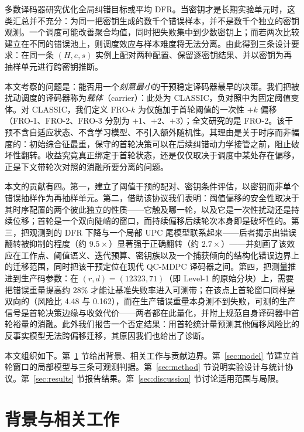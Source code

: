 \documentclass[UTF8,a4paper,10pt,twocolumn]{ctexart}
\begin{document}
多数译码器研究优化全局纠错目标或平均 DFR。当密钥才是长期实验单元时，这类汇总并不充分：为同一把密钥生成的数千个错误样本，并不是数千个独立的密钥观测。一个调度可能改善聚合均值，同时把失败集中到少数密钥上；而若两次比较建立在不同的错误池上，则调度效应与样本难度将无法分离。由此得到三条设计要求：在同一条 $(H,e,s)$ 实例上配对两种配置、保留逐密钥结果、并以密钥为再抽样单元进行跨密钥推断。

本文考察的问题是：能否用一个\emph{刻意最小}的干预稳定译码器最早的决策。我们把被扰动调度的译码器称为\emph{载体}（carrier）：此处为 CLASSIC，负对照中为固定阈值变体。对 CLASSIC，我们定义 FRO-$k$ 为仅施加于首轮阈值的一次性 $+k$ 偏移（FRO-1、FRO-2、FRO-3 分别为 $+1$、$+2$、$+3$）；全文研究的是 FRO-2。该干预不含自适应状态、不含学习模型、不引入额外随机性。其理由是关于时序而非幅度的：初始综合征最重，保守的首轮决策可以在后续纠错动力学接管之前，阻止破坏性翻转。收益究竟真正绑定于首轮状态，还是仅仅取决于调度中某处存在偏移，正是下文带轮次对照的消融所要分离的问题。

本文的贡献有四。第一，建立了阈值干预的配对、密钥条件评估，以密钥而非单个错误抽样作为再抽样单元。第二，借助该协议我们表明：阈值偏移的安全性取决于其时序配置的两个彼此独立的性质——它触及哪一轮，以及它是一次性扰动还是持续位移；首轮是一个双向陡峭的窗口，而持续偏移后续轮次本身即是破坏性的。第三，把观测到的 DFR 下降与一个局部 UPC 尾模型联系起来——后者揭示出错误翻转被抑制的程度（约 $9.5\times$）显著强于正确翻转（约 $2.7\times$）——并刻画了该效应在工作点、阈值语义、迭代预算、密钥族以及一个捕获倾向的结构化错误边界上的迁移范围，同时把该干预定位在现代 QC-MDPC 译码器之间。第四，把测量推进到生产码参数：在 $(r,d)=(12323,71)$（即 Level-1 的原始分块）上，需要把错误重量提高约 $28\%$ 才能让基准失败率进入可测带；在该点上首轮窗口同样是双向的（风险比 4.48 与 0.162），而在生产错误重量本身测不到失败，可测的生产信号是首轮决策边缘与收敛代价——两者都在此量化，并附上规范自身译码器中首轮裕量的消融。此外我们报告一个否定结果：用首轮统计量预测其他偏移风险比的反事实模型无法跨偏移迁移，其原因我们也给出了诊断。

本文组织如下。第~\ref{sec:background} 节给出背景、相关工作与贡献边界。第~\ref{sec:model} 节建立首轮窗口的局部模型与三条可观测判据。第~\ref{sec:method} 节说明实验设计与统计协议。第~\ref{sec:results} 节报告结果。第~\ref{sec:discussion} 节讨论适用范围与局限。

\section{背景与相关工作}\label{sec:background}
\end{document}
